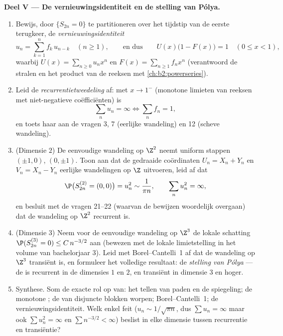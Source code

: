 \begin{problem}
\medskip
\noindent\textbf{Deel V --- De vernieuwingsidentiteit en de
stelling van Pólya.}
\begin{enumerate}[resume]
  \item Bewijs, door $\{S_{2n} = 0\}$ te partitioneren over het
        tijdstip van de eerste terugkeer, de
        \emph{vernieuwingsidentiteit}
        \[
        u_n = \sum_{k=1}^n f_k\,u_{n-k} \quad (n \geq 1),
        \qquad\text{en dus}\qquad
        U(x)\bigl(1 - F(x)\bigr) = 1 \quad (0 \leq x < 1),
        \]
        waarbij $U(x) = \sum_{n\geq0}u_nx^n$ en $F(x) =
        \sum_{n\geq1}f_nx^n$ (verantwoord de stralen en het product
        van de reeksen met \cref{ch:b2:powerseries}).
  \item Leid de \emph{recurrentietweedeling} af: met $x \to 1^-$
        (monotone limieten van reeksen met niet-negatieve
        coëfficiënten) is
        \[
        \sum_n u_n = \infty \iff \sum_n f_n = 1 ,
        \]
        en toets haar aan de vragen 3, 7 (eerlijke wandeling) en 12
        (scheve wandeling).
  \item (Dimensie $2$) De eenvoudige wandeling op $\Z^2$ neemt
        uniform stappen $(\pm1, 0)$, $(0, \pm1)$. Toon aan dat de
        gedraaide coördinaten $U_n = X_n + Y_n$ en $V_n = X_n -
        Y_n$ \emph{} eerlijke wandelingen op $\Z$
        uitvoeren, leid af dat
        \[
        \P\bigl(S^{(2)}_{2n} = (0,0)\bigr) = u_n^2 \sim
        \frac1{\pi n},
        \qquad \sum_n u_n^2 = \infty ,
        \]
        en besluit met de vragen 21--22 (waarvan de bewijzen
        woordelijk overgaan) dat de wandeling op $\Z^2$ recurrent
        is.
  \item (Dimensie $3$) Neem voor de eenvoudige wandeling op $\Z^3$
        de lokale schatting $\P(S^{(3)}_{2n} = 0) \leq
        C\,n^{-3/2}$ aan (bewezen met de lokale limietstelling in
        het volume van bachelorjaar 3). Leid met
        Borel--Cantelli~1 af dat de wandeling op $\Z^3$ transiënt
        is, en formuleer het volledige resultaat: de \emph{stelling
        van Pólya} --- de  is recurrent
        in de dimensies $1$ en $2$, en transiënt in dimensie $3$ en
        hoger.
  \item Synthese. Som de exacte rol op van: het tellen van paden en
        de spiegeling; de monotone ; de
         van disjuncte blokken worpen;
        Borel--Cantelli~1; de vernieuwingsidentiteit. Welk enkel
         feit ($u_n \sim 1/\sqrt{\pi n}$, dus $\sum u_n =
        \infty$ maar ook $\sum u_n^2 = \infty$ en $\sum n^{-3/2} <
        \infty$) beslist in elke dimensie tussen recurrentie en
        transiëntie?
\end{enumerate}
\end{problem}
